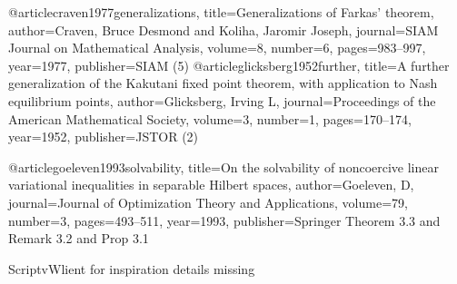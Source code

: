 
@article{craven1977generalizations,
  title={Generalizations of Farkas’ theorem},
  author={Craven, Bruce Desmond and Koliha, Jaromir Joseph},
  journal={SIAM Journal on Mathematical Analysis},
  volume={8},
  number={6},
  pages={983--997},
  year={1977},
  publisher={SIAM}
}
(5)
@article{glicksberg1952further,
  title={A further generalization of the Kakutani fixed point theorem, with application to Nash equilibrium points},
  author={Glicksberg, Irving L},
  journal={Proceedings of the American Mathematical Society},
  volume={3},
  number={1},
  pages={170--174},
  year={1952},
  publisher={JSTOR}
}
(2)


@article{goeleven1993solvability,
  title={On the solvability of noncoercive linear variational inequalities in separable Hilbert spaces},
  author={Goeleven, D},
  journal={Journal of Optimization Theory and Applications},
  volume={79},
  number={3},
  pages={493--511},
  year={1993},
  publisher={Springer}
}
Theorem 3.3 and Remark 3.2 and Prop 3.1

ScriptvWlient for inspiration details missing
